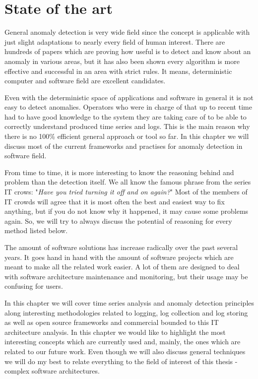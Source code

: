 \chapter{State of the art}
\label{chap:stateOfTheArt}

General anomaly detection is very wide field since the concept is applicable with just slight adaptations to nearly every field of human interest. There are hundreds of papers which are proving how useful is to detect and know about an anomaly in various areas, but it has also been shown every algorithm is more effective and successful in an area with strict rules. It means, deterministic computer and software field are excellent candidates.

Even with the deterministic space of applications and software in general it is not easy to detect anomalies. Operators who were in charge of that up to recent time had to have good knowledge to the system they are taking care of to be able to correctly understand produced time series and logs. This is the main reason why there is no 100\% efficient general approach or tool so far.  In this chapter we will discuss most of the current frameworks and practises for anomaly detection in software field.

From time to time, it is more interesting to know the reasoning behind and problem than the detection itself. We all know the famous phrase from the series IT crows: "\textit{Have you tried turning it off and on again?}" Most of the members of IT crowds will agree that it is most often the best and easiest way to fix anything, but if you do not know why it happened, it may cause some problems again. So, we will try to always discuss the potential of reasoning for every method listed below.

The amount of software solutions has increase radically over the past several years. It goes hand in hand with the amount of software projects which are meant to make all the related work easier. A lot of them are designed to deal with software architecture maintenance and monitoring, but their usage may be confusing for users.

In this chapter we will cover time series analysis and anomaly detection principles along interesting methodologies related to logging, log collection and log storing as well as open source frameworks and commercial bounded to this IT architecture analysis. In this chapter we would like to highlight the most interesting concepts which are currently used and, mainly, the ones which are related to our future work. Even though we will also discuss general techniques we will do my best to relate everything to the field of interest of this thesis - complex software architectures.

